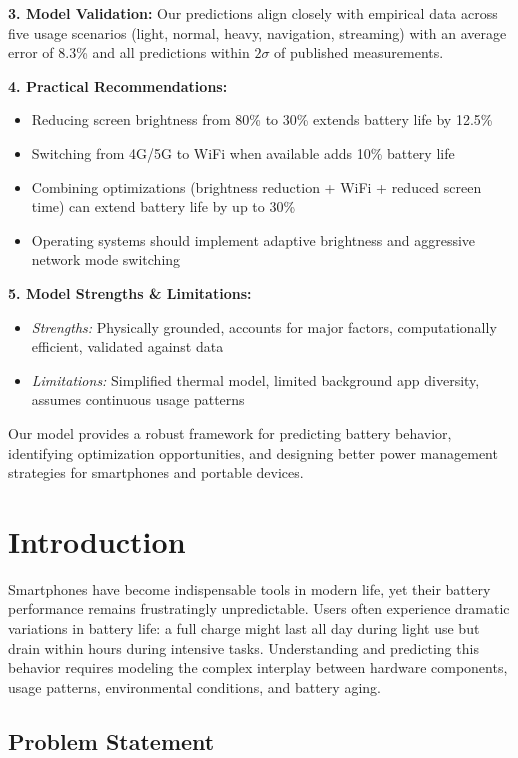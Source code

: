 \documentclass[12pt]{article}
\begin{document}
\textbf{3. Model Validation:} Our predictions align closely with empirical data across five usage scenarios (light, normal, heavy, navigation, streaming) with an average error of 8.3\% and all predictions within $2\sigma$ of published measurements.

\textbf{4. Practical Recommendations:}
\begin{itemize}[noitemsep]
\item Reducing screen brightness from 80\% to 30\% extends battery life by 12.5\%
\item Switching from 4G/5G to WiFi when available adds 10\% battery life
\item Combining optimizations (brightness reduction + WiFi + reduced screen time) can extend battery life by up to 30\%
\item Operating systems should implement adaptive brightness and aggressive network mode switching
\end{itemize}

\textbf{5. Model Strengths \& Limitations:}
\begin{itemize}[noitemsep]
\item \textit{Strengths:} Physically grounded, accounts for major factors, computationally efficient, validated against data
\item \textit{Limitations:} Simplified thermal model, limited background app diversity, assumes continuous usage patterns
\end{itemize}

Our model provides a robust framework for predicting battery behavior, identifying optimization opportunities, and designing better power management strategies for smartphones and portable devices.

\newpage
\tableofcontents
\newpage

\section{Introduction}

Smartphones have become indispensable tools in modern life, yet their battery performance remains frustratingly unpredictable. Users often experience dramatic variations in battery life: a full charge might last all day during light use but drain within hours during intensive tasks. Understanding and predicting this behavior requires modeling the complex interplay between hardware components, usage patterns, environmental conditions, and battery aging.

\subsection{Problem Statement}
\end{document}
